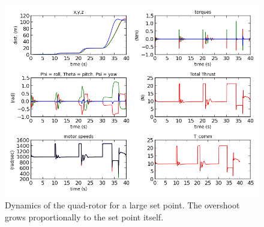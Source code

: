 \begin{figure}[htbp]
	\centering
		\includegraphics[scale = 0.5]{Figures/largeSetpointDifferencesTest_timedomain.png}
	\caption[Dynamics of the quad-rotor for a large set point. The overshoot grows proportionally to the set point itself.]{Dynamics of the quad-rotor for a large set point. The overshoot grows proportionally to the set point itself. }
	\label{fig:Large Setpoint Time Domain}
\end{figure}





